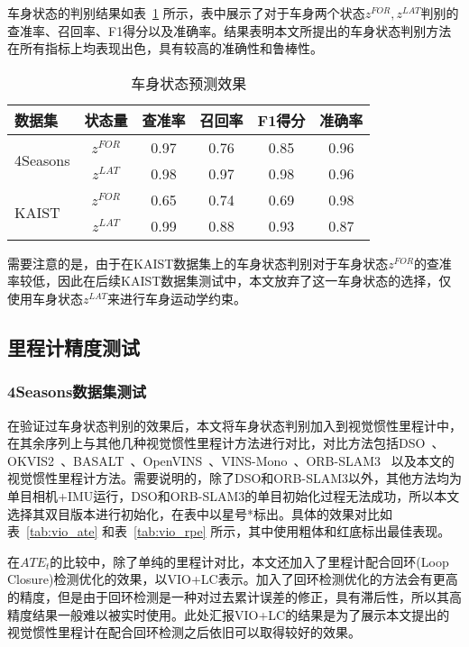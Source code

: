 车身状态的判别结果如表~\ref{tab:pose_detection} 所示，表中展示了对于车身两个状态$z^{FOR},z^{LAT}$判别的查准率、召回率、F1得分以及准确率。结果表明本文所提出的车身状态判别方法在所有指标上均表现出色，具有较高的准确性和鲁棒性。

\begin{table}
\centering
\caption{车身状态预测效果}
\begin{tabular}{lccccc}
\toprule
数据集 &  状态量  & 查准率  & 召回率  & F1得分 & 准确率  \\ \midrule
\multirow{2}{*}{4Seasons} & $z^{FOR}$ & 0.97 & 0.76 & 0.85 & 0.96 \\
                          & $z^{LAT}$ & 0.98 & 0.97 & 0.98 & 0.96 \\ \midrule
\multirow{2}{*}{KAIST}    & $z^{FOR}$ & 0.65 & 0.74 & 0.69 & 0.98 \\
                          & $z^{LAT}$ & 0.99 & 0.88 & 0.93 & 0.87 \\
\bottomrule
\end{tabular}
\label{tab:pose_detection}
\end{table}

需要注意的是，由于在KAIST数据集上的车身状态判别对于车身状态$z^{FOR}$的查准率较低，因此在后续KAIST数据集测试中，本文放弃了这一车身状态的选择，仅使用车身状态$z^{LAT}$来进行车身运动学约束。

\subsection{里程计精度测试}
\subsubsection{4Seasons数据集测试}
在验证过车身状态判别的效果后，本文将车身状态判别加入到视觉惯性里程计中，在其余序列上与其他几种视觉惯性里程计方法进行对比，对比方法包括DSO~\cite{von2018direct}、OKVIS2~\cite{leutenegger2022okvis2}、BASALT~\cite{usenko2019visual}、OpenVINS~\cite{Geneva2020ICRA}、VINS-Mono~\cite{qin2018vins}、ORB-SLAM3~\cite{campos2021orb} 以及本文的视觉惯性里程计方法。需要说明的，除了DSO和ORB-SLAM3以外，其他方法均为单目相机+IMU运行，DSO和ORB-SLAM3的单目初始化过程无法成功，所以本文选择其双目版本进行初始化，在表中以星号*标出。具体的效果对比如表~\ref{tab:vio_ate} 和表~\ref{tab:vio_rpe} 所示，其中使用粗体和红底标出最佳表现。

在$ATE_t$的比较中，除了单纯的里程计对比，本文还加入了里程计配合回环(Loop Closure)检测优化的效果，以VIO+LC表示。加入了回环检测优化的方法会有更高的精度，但是由于回环检测是一种对过去累计误差的修正，具有滞后性，所以其高精度结果一般难以被实时使用。此处汇报VIO+LC的结果是为了展示本文提出的视觉惯性里程计在配合回环检测之后依旧可以取得较好的效果。

